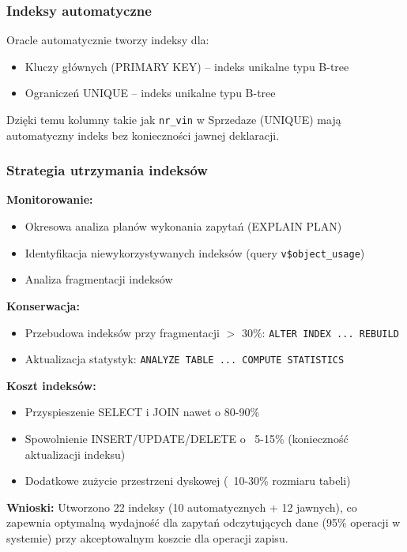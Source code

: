 \documentclass[a4paper,titleauthor]{mwart}
\begin{document}
	\subsubsection{Indeksy automatyczne}

	Oracle automatycznie tworzy indeksy dla:
	\begin{itemize}
		\item Kluczy głównych (PRIMARY KEY) -- indeks unikalne typu B-tree
		\item Ograniczeń UNIQUE -- indeks unikalne typu B-tree
	\end{itemize}

	Dzięki temu kolumny takie jak \texttt{nr\_vin} w Sprzedaze (UNIQUE) mają automatyczny indeks bez konieczności jawnej deklaracji.

	\subsubsection{Strategia utrzymania indeksów}

	\textbf{Monitorowanie:}
	\begin{itemize}
		\item Okresowa analiza planów wykonania zapytań (EXPLAIN PLAN)
		\item Identyfikacja niewykorzystywanych indeksów (query \texttt{v\$object\_usage})
		\item Analiza fragmentacji indeksów
	\end{itemize}

	\textbf{Konserwacja:}
	\begin{itemize}
		\item Przebudowa indeksów przy fragmentacji $>$ 30\%: \texttt{ALTER INDEX ... REBUILD}
		\item Aktualizacja statystyk: \texttt{ANALYZE TABLE ... COMPUTE STATISTICS}
	\end{itemize}

	\textbf{Koszt indeksów:}
	\begin{itemize}
		\item [+] Przyspieszenie SELECT i JOIN nawet o 80-90\%
		\item [-] Spowolnienie INSERT/UPDATE/DELETE o ~5-15\% (konieczność aktualizacji indeksu)
		\item [-] Dodatkowe zużycie przestrzeni dyskowej (~10-30\% rozmiaru tabeli)
	\end{itemize}

	\textbf{Wnioski:} Utworzono 22 indeksy (10 automatycznych + 12 jawnych), co zapewnia optymalną wydajność dla zapytań odczytujących dane (95\% operacji w systemie) przy akceptowalnym koszcie dla operacji zapisu.
\end{document}
